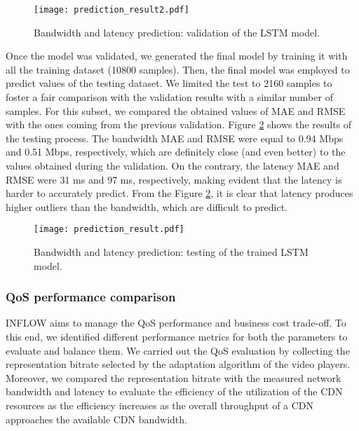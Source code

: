 \begin{figure}[htp]
	\centering
	\texttt{[image: prediction\_result2.pdf]}
	\caption{Bandwidth and latency prediction: validation of the LSTM model.}
	\label{fig:IEEETBC2020validation}
\end{figure}

Once the model was validated, we generated the final model by training it with all the training dataset (10800 samples). Then, the final model was employed to predict values of the testing dataset. We limited the test to 2160 samples to foster a fair comparison with the validation results with a similar number of samples. For this subset, we compared the obtained values of MAE and RMSE with the ones coming from the previous validation. Figure \ref{fig:IEEETBC2020testing} shows the results of the testing process. The bandwidth MAE and RMSE were equal to 0.94 Mbps and 0.51 Mbps, respectively, which are definitely close (and even better) to the values obtained during the validation. On the contrary, the latency MAE and RMSE were 31 ms and 97 ms, respectively, making evident that the latency is harder to accurately predict. From the Figure \ref{fig:IEEETBC2020testing}, it is clear that latency produces higher outliers than the bandwidth, which are difficult to predict.

\begin{figure}[htp]
	\centering
	\texttt{[image: prediction\_result.pdf]}
	\caption{Bandwidth and latency prediction: testing of the trained LSTM model.}
	\label{fig:IEEETBC2020testing}
\end{figure}

\subsubsection{QoS performance comparison}
\label{sec:comparison}

INFLOW aims to manage the QoS performance and business cost trade-off. To this end, we identified different performance metrics for both the parameters to evaluate and balance them. We carried out the QoS evaluation by collecting the representation bitrate selected by the adaptation algorithm of the video players. Moreover, we compared the representation bitrate with the measured network bandwidth and latency to evaluate the efficiency of the utilization of the CDN resources as the efficiency increases as the overall throughput of a CDN approaches the available CDN bandwidth.

